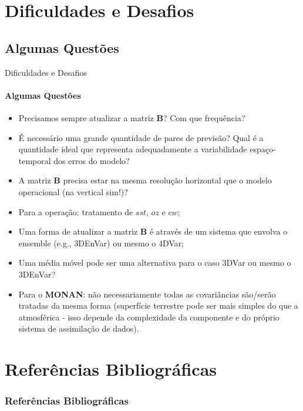 \documentclass[10pt,aspectratio=169]{beamer}
\begin{document}
\section{Dificuldades e Desafios}

\subsection{Algumas Questões}

\begin{frame}{Dificuldades e Desafios}
\framesubtitle{Algumas Questões \faQuestionCircle}
  \begin{itemize}
    \item Precisamos sempre atualizar a matriz $\mathbf{B}$? Com que frequência?
    \pause
    \item É necessário uma grande quantidade de pares de previsão? Qual é a quantidade ideal que representa adequadamente a variabilidade espaço-temporal dos erros do modelo?
    \pause        
    \item A matriz $\mathbf{B}$ precisa estar na mesma resolução horizontal que o modelo operacional (na vertical sim!)?
    \pause        
    \item Para a operação: tratamento de $sst$, $oz$ e $cw$;
    \pause        
    \item Uma forma de atualizar a matriz $\mathbf{B}$ é através de um sistema que envolva o ensemble (e.g., 3DEnVar) ou mesmo o 4DVar;
    \pause        
    \item Uma média móvel pode ser uma alternativa para o caso 3DVar ou mesmo o 3DEnVar?
    \pause        
    \item Para o \textbf{MONAN}: não necessariamente todas as covariâncias são/serão tratadas da mesma forma (superfície terrestre pode ser mais simples do que a atmosférica - isso depende da complexidade da componente e do próprio sistema de assimilação de dados).
  \end{itemize}
\end{frame}

\section{Referências Bibliográficas}

\begin{frame}
\frametitle{Referências Bibliográficas}
\framesubtitle{\faBookOpen~\faCode~\faPython}
  \vspace{-1.5em}
  \small
\end{frame}
\end{document}
